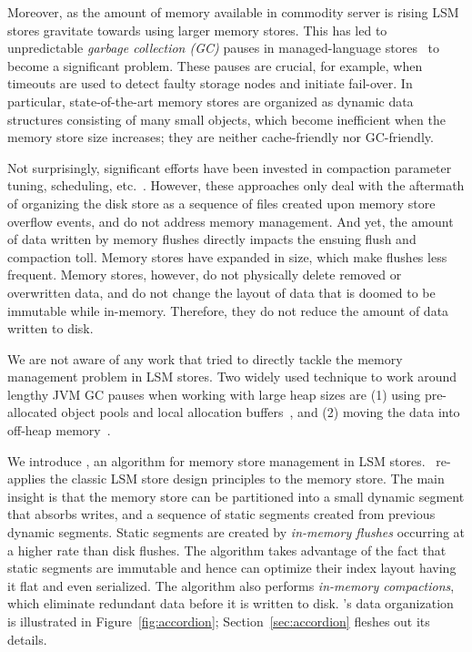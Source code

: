 Moreover, as the amount of memory available in commodity server is rising LSM stores gravitate towards using larger memory stores.
This has led to unpredictable \emph{garbage collection (GC)} pauses in managed-language stores~\cite{cassandra, hbase} to become a significant problem.
These pauses are crucial, for example, when timeouts are used to detect faulty storage nodes and initiate fail-over.
In particular, state-of-the-art memory stores are organized as dynamic data structures consisting of many small objects,
which become inefficient when the memory store size increases; they are neither cache-friendly nor GC-friendly.

Not surprisingly, significant efforts have been invested in compaction parameter tuning, scheduling, etc.~\cite{hbasetuning,
universalcompaction,scylladbcompaction,Sears:2012}. However, these approaches only deal with the aftermath
of organizing the disk store as a sequence of files created upon memory store overflow events, and do not 
address memory management. 
And yet, the amount of data written by memory flushes  
directly impacts the ensuing flush and compaction toll. 
Memory stores have expanded in size, which make flushes less frequent. 
Memory stores, however, do not physically delete removed or overwritten data, and do not change the layout of data that is doomed to be immutable while in-memory.
Therefore, they do not reduce the amount of data written to disk.

We are not aware of any work that tried to directly tackle the memory management problem in LSM stores. 
Two widely used technique to work around lengthy JVM GC pauses when working with large heap sizes are 
(1) using pre-allocated object pools and local allocation buffers~\cite{hbasemslab}, and 
(2) moving the data into off-heap memory~\cite{cassandraoffheap}. 

We introduce \sys, an algorithm for memory store management in LSM stores. 
\sys\ re-applies the classic LSM store design principles to the memory store. The main insight is that the memory store can be partitioned
 into a small dynamic segment that absorbs writes, and a sequence of static segments created 
 from previous dynamic segments. Static segments are created by \emph{in-memory flushes} occurring at a higher rate
 than disk flushes.  The algorithm takes advantage of the fact that static segments are immutable and hence can optimize their index layout having it flat and even serialized.
 The algorithm also performs \emph{in-memory compactions}, which eliminate redundant %
 data before it is written to disk.
\sys's data organization is illustrated in Figure~\ref{fig:accordion};
 Section~\ref{sec:accordion} fleshes out its details.

